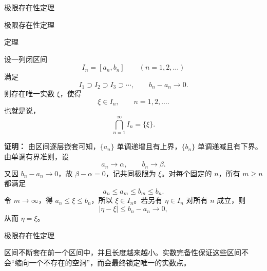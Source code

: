 \documentclass[aspectratio=169,10pt,fontset=fandol]{ctexbeamer}
\begin{document}
\begin{frame}[t,fragile]{极限存在性定理}
\footnotesize
{\footnotesize



\iffalse


}
\end{frame}
\begin{frame}[t,fragile]{极限存在性定理}
\footnotesize
\begin{block}{定理}
{\footnotesize

设一列闭区间
\[
I_n=[a_n,b_n]\qquad(n=1,2,\ldots)
\]
满足
\[
I_1\supset I_2\supset I_3\supset\cdots,
\qquad b_n-a_n\to0.
\]
则存在唯一实数 \(\xi\)，使得
\[
\xi\in I_n,\qquad n=1,2,\ldots.
\]
也就是说，
\[
\bigcap_{n=1}^{\infty}I_n=\{\xi\}.
\]

}
\end{block}
\pause
{\footnotesize
\textbf{证明：}
由区间逐层嵌套可知，\(\{a_n\}\) 单调递增且有上界，\(\{b_n\}\) 单调递减且有下界。由单调有界准则，设
\[
a_n\to\alpha,\qquad b_n\to\beta.
\]
又因 \(b_n-a_n\to0\)，故 \(\beta-\alpha=0\)，记共同极限为 \(\xi\)。对每个固定的 \(n\)，所有 \(m\ge n\) 都满足
\[
a_n\le a_m\le b_m\le b_n.
\]
令 \(m\to\infty\)，得 \(a_n\le\xi\le b_n\)，所以 \(\xi\in I_n\)。若另有 \(\eta\in I_n\) 对所有 \(n\) 成立，则
\[
|\eta-\xi|\le b_n-a_n\to0,
\]
从而 \(\eta=\xi\)。

}
\end{frame}
\begin{frame}[t,fragile]{极限存在性定理}
\footnotesize
{\footnotesize
区间不断套在前一个区间中，并且长度越来越小。实数完备性保证这些区间不会“缩向一个不存在的空洞”，而会最终锁定唯一的实数点。
\begin{center}
\end{center}

}
\end{frame}
\end{document}
